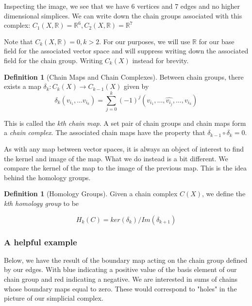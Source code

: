 \documentclass[12pt]{article}
\theoremstyle{plain}
\theoremstyle{definition}
\newtheorem{definition}[thm]{Definition}
\begin{document}
Inspecting the image, we see that we have 6 vertices and 7 edges and no higher dimensional simplices. 
We can write down the chain groups associated with this complex: $C_1(X, \mathbb{R}) = \mathbb{R}^6 , C_2(X, \mathbb{R}) = \mathbb{R}^7$


Note that $C_k(X, \mathbb{R}) = 0, k > 2$. For our purposes, we will use $\mathbb{R}$ for our base field for the 
associated vector space and will suppress writing down the associated field for the chain group. Writing 
$C_k(X)$ instead for brevity.

\begin{definition}[Chain Maps and Chain Complexes]Between chain groups, there exists a map $\delta_{k}: C_k(X) \to C_{k-1}(X)$ given by
\begin{equation}
  \delta_k (v_{i_1}, \ldots v_{i_k}) =  \sum_{j = 0}^{k} (-1)^j (v_{i_1}, \ldots, \hat{v_{i_j}} , \ldots, v_{i_k})
\end{equation}

This is called the \textit{kth chain map}. A set pair of chain groups and chain maps form a \textit{chain complex}.
The associated chain maps have the property that $\delta_{k-1} \circ \delta_{k} = 0$. 

\end{definition}

As with any map between vector spaces, it is always an object of interest to find the kernel and image of the map. What we do instead
is a bit different. We compare the kernel of the map to the image of the previous map. This is the idea behind the homology groups.

\begin{definition}[Homology Groups]

Given a chain complex $C(X)$, we define the \textit{kth homology group} to be 

\begin{equation}
H_k(C) = ker(\delta_k) / Im(\delta_{k+1})
\end{equation}

\end{definition}

\subsubsection{A helpful example}

Below, we have the result of the boundary map acting on the chain group defined by 
our edges. With blue indicating a positive value of the basis element of our chain 
group and red indicating a negative. We are interested in sums of chains whose boundary
maps equal to zero. These would correspond to "holes" in the picture of our simplicial complex.
\end{document}
